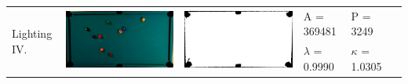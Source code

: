 \begin{tabular}{|l|c|c|l|l|c|}
\multirow{2}{*}{Lighting IV.} & \multirow{2}{*}{\includegraphics[scale=0.05]{../images/1/9_img.png}} & \multirow{2}{*}{\includegraphics[scale=0.05]{../images/1/9_mask.png}} & A = 369481 & P = 3249 & \multirow{2}{*}{}\\ 
& & & $\lambda$ = 0.9990 & $\kappa$ = 1.0305 & \\
\hline


\end{tabular}
